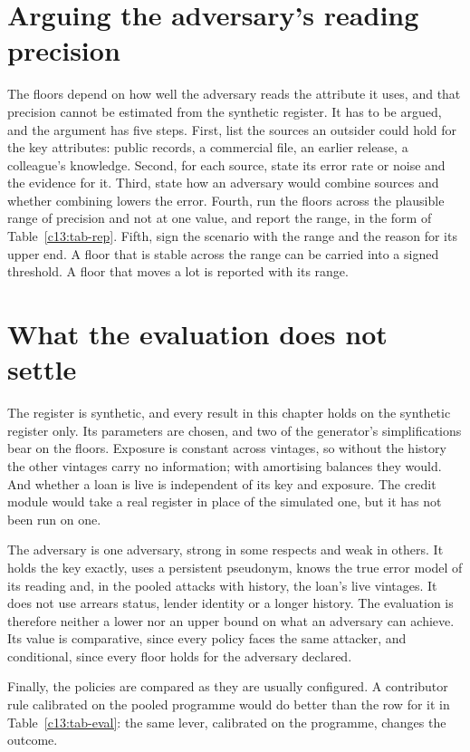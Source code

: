 \section{Arguing the adversary's reading precision}\label{c13:sec-precision}

The floors depend on how well the adversary reads the attribute it uses, and that precision cannot be estimated from the synthetic register. It has to be argued, and the argument has five steps. First, list the sources an outsider could hold for the key attributes: public records, a commercial file, an earlier release, a colleague's knowledge. Second, for each source, state its error rate or noise and the evidence for it. Third, state how an adversary would combine sources and whether combining lowers the error. Fourth, run the floors across the plausible range of precision and not at one value, and report the range, in the form of Table~\ref{c13:tab-rep}. Fifth, sign the scenario with the range and the reason for its upper end. A floor that is stable across the range can be carried into a signed threshold. A floor that moves a lot is reported with its range.

\section{What the evaluation does not settle}\label{c13:sec-limits}

The register is synthetic, and every result in this chapter holds on the synthetic
register only. Its parameters are chosen, and two of the generator's simplifications
bear on the floors. Exposure is constant across vintages, so without the history the
other vintages carry no information; with amortising balances they would. And whether
a loan is live is independent of its key and exposure. The credit module would take a
real register in place of the simulated one, but it has not been run on one.

The adversary is one adversary, strong in some respects and weak in others. It holds
the key exactly, uses a persistent pseudonym, knows the true error model of its
reading and, in the pooled attacks with history, the loan's live vintages. It does not
use arrears status, lender identity or a longer history. The evaluation is therefore
neither a lower nor an upper bound on what an adversary can achieve. Its value is
comparative, since every policy faces the same attacker, and conditional, since every
floor holds for the adversary declared.

Finally, the policies are compared as they are usually configured. A contributor rule
calibrated on the pooled programme would do better than the row for it in
Table~\ref{c13:tab-eval}: the same lever, calibrated on the programme, changes the
outcome.

